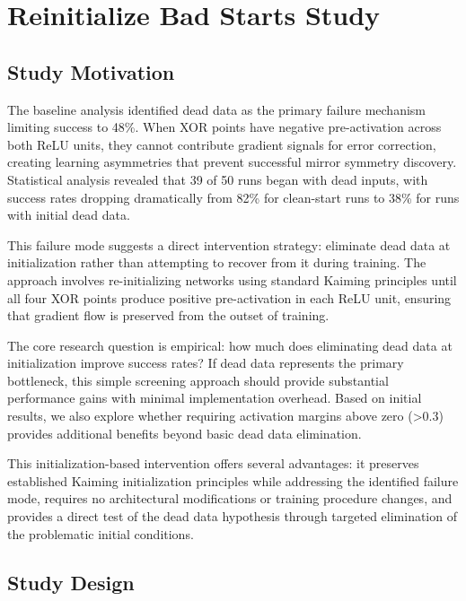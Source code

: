 \section{Reinitialize Bad Starts Study}
\label{sec:relu1-reinit}

\subsection*{Study Motivation}

The baseline analysis identified dead data as the primary failure mechanism limiting success to 48\%. When XOR points have negative pre-activation across both ReLU units, they cannot contribute gradient signals for error correction, creating learning asymmetries that prevent successful mirror symmetry discovery. Statistical analysis revealed that 39 of 50 runs began with dead inputs, with success rates dropping dramatically from 82\% for clean-start runs to 38\% for runs with initial dead data.

This failure mode suggests a direct intervention strategy: eliminate dead data at initialization rather than attempting to recover from it during training. The approach involves re-initializing networks using standard Kaiming principles until all four XOR points produce positive pre-activation in each ReLU unit, ensuring that gradient flow is preserved from the outset of training.

The core research question is empirical: how much does eliminating dead data at initialization improve success rates? If dead data represents the primary bottleneck, this simple screening approach should provide substantial performance gains with minimal implementation overhead. Based on initial results, we also explore whether requiring activation margins above zero (>0.3) provides additional benefits beyond basic dead data elimination.

This initialization-based intervention offers several advantages: it preserves established Kaiming initialization principles while addressing the identified failure mode, requires no architectural modifications or training procedure changes, and provides a direct test of the dead data hypothesis through targeted elimination of the problematic initial conditions.


\subsection*{Study Design}

